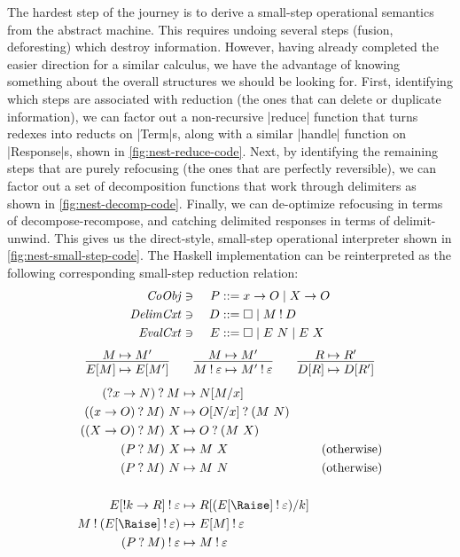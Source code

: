 \documentclass[sigplan,screen]{acmart}
\begin{document}
The hardest step of the journey is to derive a small-step operational semantics
from the abstract machine.  This requires undoing several steps (fusion,
deforesting) which destroy information.  However, having already completed the
easier direction for a similar calculus, we have the advantage of knowing
something about the overall structures we should be looking for.  First,
identifying which steps are associated with reduction (the ones that can delete
or duplicate information), we can factor out a non-recursive \hs|reduce|
function that turns redexes into reducts on \hs|Term|s, along with a similar
\hs|handle| function on \hs|Response|s, shown in \cref{fig:nest-reduce-code}.
Next, by identifying the remaining steps that are purely refocusing (the ones
that are perfectly reversible), we can factor out a set of decomposition
functions that work through delimiters as shown in \cref{fig:nest-decomp-code}.
Finally, we can de-optimize refocusing in terms of decompose-recompose, and
catching delimited responses in terms of delimit-unwind.  This gives us the
direct-style, small-step operational interpreter shown in
\cref{fig:nest-small-step-code}.  The Haskell implementation can be
reinterpreted as the following corresponding small-step reduction relation:
\begin{alignat*}{3}
  \mathit{CoObj} &\ni{}& P
  &::= x \to O
  \mid X \to O
  \\
  \mathit{DelimCxt} &\ni{}& D
  &::= \square
  \mid M \mathbin{!} D
  \\
  \mathit{EvalCxt} &\ni{}& E
  &::= \square
  \mid E ~ N
  \mid E ~ X
\end{alignat*}
\begin{gather*}
  \infer%
  {E[M] \mapsto E[M']}
  {M \mapsto M'}
  \qquad
  \infer%
  {M \ans \varepsilon \mapsto M' \ans \varepsilon}
  {M \mapsto M'}
  \qquad
  \infer%
  {D[R] \mapsto D[R']}
  {R \mapsto R'}
\end{gather*}
\begin{align*}
  (\ask x \to N) \ask M
  &\mapsto
  N\subst{x}{M}
  \\
  ((x \to O) \ask M) ~ N
  &\mapsto
  O\subst{x}{N} \ask (M ~ N)
  \\
  ((X \to O) \ask M) ~ X
  &\mapsto
  O \ask (M ~ X)
  \\
  (P \ask M) ~ X
  &\mapsto
  M ~ X
  &(\text{otherwise})
  \\
  (P \ask M) ~ N
  &\mapsto
  M ~ N
  &(\text{otherwise})
  \\\\
  E[\ans k \to R] \ans \varepsilon
  &\mapsto
  R\subst{k}{(E[\Raise] \ans \varepsilon)}
  \\
  M \ans (E[\Raise] \ans \varepsilon)
  &\mapsto
  E[M] \ans \varepsilon
  \\
  (P \ask M) \ans \varepsilon
  &\mapsto
  M \ans \varepsilon
\end{align*}
\end{document}
